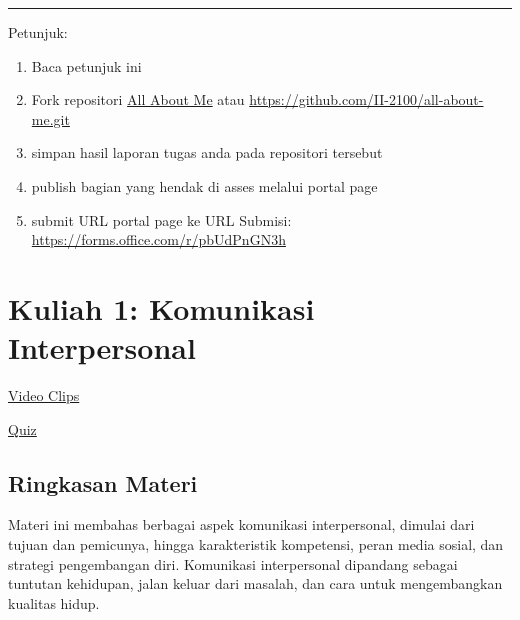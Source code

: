 \documentclass[
  letterpaper,
  DIV=11,
  numbers=noendperiod]{scrreprt}
\begin{document}
\begin{center}\rule{0.5\linewidth}{0.5pt}\end{center}

\begin{tcolorbox}[enhanced jigsaw, left=2mm, title=\textcolor{quarto-callout-important-color}{\faExclamation}\hspace{0.5em}{Important}, titlerule=0mm, bottomrule=.15mm, toprule=.15mm, breakable, coltitle=black, leftrule=.75mm, colframe=quarto-callout-important-color-frame, rightrule=.15mm, opacitybacktitle=0.6, opacityback=0, colbacktitle=quarto-callout-important-color!10!white, colback=white, bottomtitle=1mm, toptitle=1mm, arc=.35mm]

Petunjuk:

\begin{enumerate}
\def\labelenumi{\arabic{enumi}.}
\item
  Baca petunjuk ini
\item
  Fork repositori \href{https://github.com/II-2100/all-about-me.git}{All
  About Me} atau \url{https://github.com/II-2100/all-about-me.git}
\item
  simpan hasil laporan tugas anda pada repositori tersebut
\item
  publish bagian yang hendak di asses melalui portal page
\item
  submit URL portal page ke URL Submisi:
  \url{https://forms.office.com/r/pbUdPnGN3h}
\end{enumerate}

\end{tcolorbox}


\chapter{Kuliah 1: Komunikasi
Interpersonal}\label{kuliah-1-komunikasi-interpersonal}

\href{https://youtube.com/playlist?list=PL_m-BplfO92EHtF458s1yWRf6u0lGZQaZ&si=hAc9s5o7a4aHXJFO}{Video
Clips}

\href{https://forms.office.com/r/WCHBJJiwXc}{Quiz}

\section{Ringkasan Materi}\label{ringkasan-materi}

Materi ini membahas berbagai aspek komunikasi interpersonal, dimulai
dari tujuan dan pemicunya, hingga karakteristik kompetensi, peran media
sosial, dan strategi pengembangan diri. Komunikasi interpersonal
dipandang sebagai tuntutan kehidupan, jalan keluar dari masalah, dan
cara untuk mengembangkan kualitas hidup.
\end{document}
